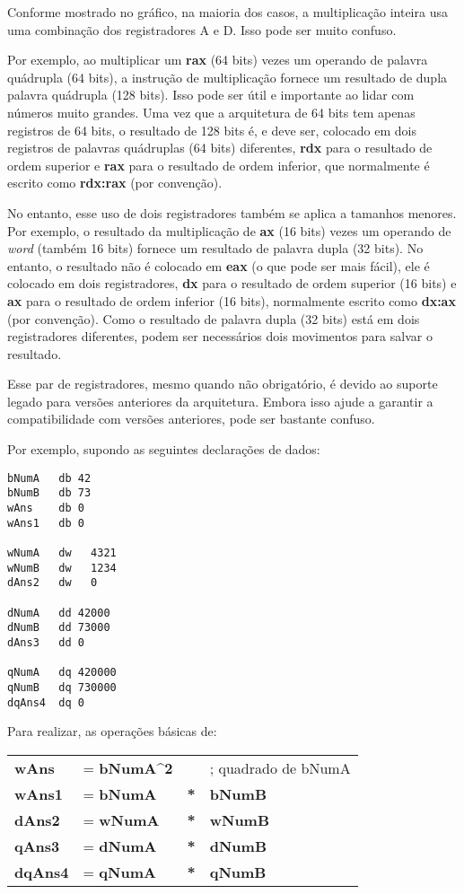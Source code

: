 Conforme mostrado no gráfico, na maioria dos casos, a multiplicação inteira usa uma combinação dos registradores A e D. Isso pode ser muito confuso.

Por exemplo, ao multiplicar um \textbf{rax} (64 bits) vezes um operando de palavra quádrupla (64 bits), a instrução de multiplicação fornece um resultado de dupla palavra quádrupla  (128 bits). Isso pode ser útil e importante ao lidar com números muito grandes. Uma vez que a arquitetura de 64 bits tem apenas registros de 64 bits, o resultado de 128 bits é, e deve ser, colocado em dois registros de palavras quádruplas (64 bits) diferentes, \textbf{rdx} para o resultado de ordem superior e \textbf{rax} para o resultado de ordem inferior, que normalmente é escrito como \textbf{rdx:rax} (por convenção).

No entanto, esse uso de dois registradores também se aplica a tamanhos menores. Por exemplo, o resultado da multiplicação de \textbf{ax} (16 bits) vezes um operando de \textit{word} (também 16 bits) fornece um resultado de palavra dupla (32 bits). No entanto, o resultado não é colocado em \textbf{eax} (o que pode ser mais fácil), ele é colocado em dois registradores, \textbf{dx} para o resultado de ordem superior (16 bits) e \textbf{ax} para o resultado de ordem inferior (16 bits), normalmente escrito como \textbf{dx:ax} (por convenção). Como o resultado de palavra dupla (32 bits) está em dois registradores diferentes, podem ser necessários dois movimentos para salvar o resultado.

Esse par de registradores, mesmo quando não obrigatório, é devido ao suporte legado para versões anteriores da arquitetura. Embora isso ajude a garantir a compatibilidade com versões anteriores, pode ser bastante confuso.

Por exemplo, supondo as seguintes declarações de dados:
\begin{lstlisting}
bNumA   db 42
bNumB   db 73
wAns    db 0
wAns1   db 0

wNumA   dw   4321
wNumB   dw   1234
dAns2   dw   0

dNumA   dd 42000
dNumB   dd 73000
dAns3   dd 0

qNumA   dq 420000
qNumB   dq 730000
dqAns4  dq 0
\end{lstlisting}

Para realizar, as operações básicas de:\\
\begin{tabular}{llcl}
	\textbf{wAns} & = \textbf{bNumA\^{}2} &&; quadrado de bNumA\\
	\textbf{wAns1} & = \textbf{bNumA} &\textbf{*}& \textbf{bNumB}\\
	\textbf{dAns2} & = \textbf{wNumA} &\textbf{*}& \textbf{wNumB}\\
	\textbf{qAns3} & = \textbf{dNumA} &\textbf{*}& \textbf{dNumB}\\
	\textbf{dqAns4} & = \textbf{qNumA} &\textbf{*}& \textbf{qNumB}\\
\end{tabular}

